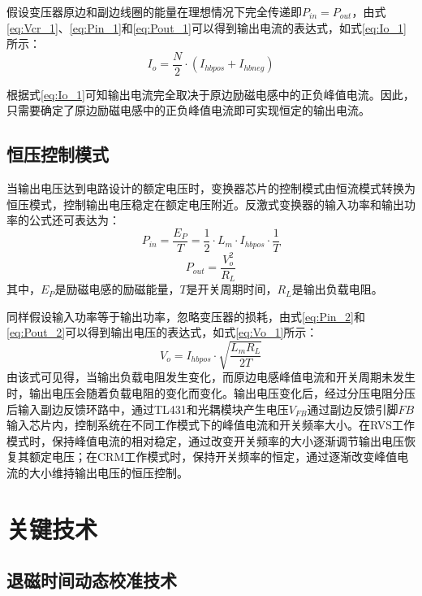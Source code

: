 假设变压器原边和副边线圈的能量在理想情况下完全传递即$P_{in}=P_{out}$，由式\eqref{eq:Vcr_1}、\eqref{eq:Pin_1}和\eqref{eq:Pout_1}可以得到输出电流的表达式，如式\eqref{eq:Io_1}所示：
\begin{equation}
    \label{eq:Io_1}
    I_o=\frac{N}{2}\cdot(I_{hbpos} + I_{hbneg})
\end{equation}

根据式\eqref{eq:Io_1}可知输出电流完全取决于原边励磁电感中的正负峰值电流。因此，只需要确定了原边励磁电感中的正负峰值电流即可实现恒定的输出电流。

\subsection{恒压控制模式}

当输出电压达到电路设计的额定电压时，变换器芯片的控制模式由恒流模式转换为恒压模式，控制输出电压稳定在额定电压附近。反激式变换器的输入功率和输出功率的公式还可表达为：
\begin{equation}
    \label{eq:Pin_2}
    P_{in} = \frac{E_P}{T}=\frac{1}{2} \cdot L_m \cdot I_{hbpos} \cdot \frac{1}{T}
\end{equation}
\begin{equation}
    \label{eq:Pout_2}
    P_{out} = \frac{V_o^2}{R_L} 
\end{equation}
其中，$E_P$是励磁电感的励磁能量，$T$是开关周期时间，$R_L$是输出负载电阻。

同样假设输入功率等于输出功率，忽略变压器的损耗，由式\eqref{eq:Pin_2}和\eqref{eq:Pout_2}可以得到输出电压的表达式，如式\eqref{eq:Vo_1}所示：
\begin{equation}
    \label{eq:Vo_1}
    V_o = I_{hbpos} \cdot \sqrt{\frac{L_m R_L}{2T}}
\end{equation}
由该式可见得，当输出负载电阻发生变化，而原边电感峰值电流和开关周期未发生时，输出电压会随着负载电阻的变化而变化。输出电压变化后，经过分压电阻分压后输入副边反馈环路中，通过TL431和光耦模块产生电压$V_{FB}$通过副边反馈引脚$FB$输入芯片内，控制系统在不同工作模式下的峰值电流和开关频率大小。在RVS工作模式时，保持峰值电流的相对稳定，通过改变开关频率的大小逐渐调节输出电压恢复其额定电压；在CRM工作模式时，保持开关频率的恒定，通过逐渐改变峰值电流的大小维持输出电压的恒压控制。


\section{关键技术}

\subsection{退磁时间动态校准技术}
\label{sec:退磁时间动态校准技术}

